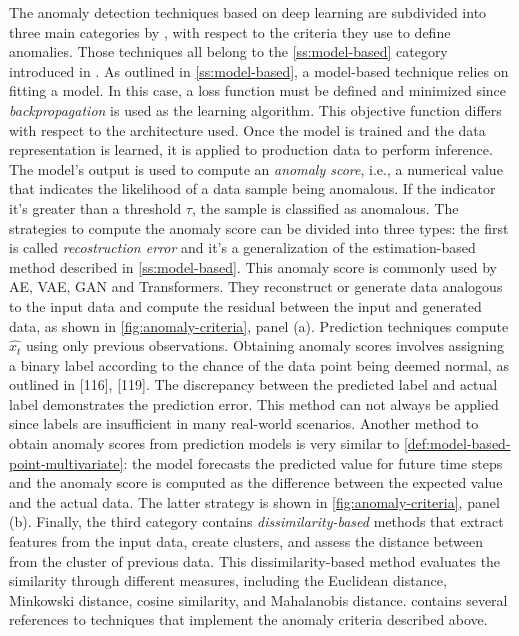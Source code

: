The anomaly detection techniques based on deep learning are subdivided into three main categories by \cite{choi2021deep}, with respect to the criteria they use to define anomalies. Those techniques all belong to the \autoref{ss:model-based} category introduced in \cite{blazquez2020review}. As outlined in \autoref{ss:model-based}, a model-based technique relies on fitting a model. In this case, a loss function must be defined and minimized since \textit{backpropagation} is used as the learning algorithm. This objective function differs with respect to the architecture used. Once the model is trained and the data representation is learned, it is applied to production data to perform inference. The model's output is used to compute an \textit{anomaly score}, i.e., a numerical value that indicates the likelihood of a data sample being anomalous. If the indicator it's greater than a threshold $\tau$, the sample is classified as anomalous. The strategies to compute the anomaly score can be divided into three types: the first is called \textit{recostruction error} and it's a generalization of the estimation-based method described in \autoref{ss:model-based}. This anomaly score is commonly used by AE, VAE, GAN and Transformers. They reconstruct or generate data analogous to the input data and compute the residual between the input and generated data, as shown in \autoref{fig:anomaly-criteria}, panel (a). Prediction techniques compute $\hat{x_t}$ using only previous observations. Obtaining anomaly scores involves assigning a binary label according to the chance of the data point being deemed normal, as outlined in [116], [119]. The discrepancy between the predicted label and actual label demonstrates the prediction error. This method can not always be applied since labels are insufficient in many real-world scenarios. Another method to obtain anomaly scores from prediction models is very similar to \autoref{def:model-based-point-multivariate}: the model forecasts the predicted value for future time steps and the anomaly score is computed as the difference between the expected value and the actual data. The latter strategy is shown in \autoref{fig:anomaly-criteria}, panel (b). Finally, the third category contains \textit{dissimilarity-based} methods that extract features from the input data, create clusters, and assess the distance between from the cluster of previous data. This dissimilarity-based method evaluates the similarity through different measures, including the Euclidean distance, Minkowski distance, cosine similarity, and Mahalanobis distance. \cite{choi2021deep} contains several references to techniques that implement the anomaly criteria described above. 

